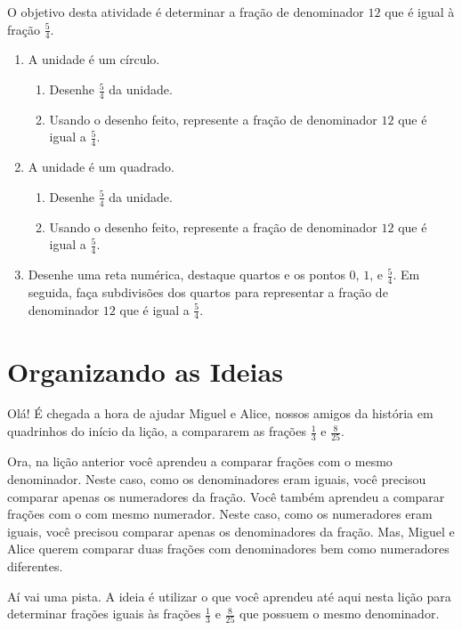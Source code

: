 \begin{atividade}{}\label{chap4-ativ8}

O objetivo desta atividade é determinar a fração de denominador $12$ que é igual à fração $\frac{5}{4}$.

\begin{enumerate}
  \item     A unidade é um círculo.
\begin{enumerate}
  \item Desenhe $\frac{5}{4}$ da unidade.
  \item Usando o desenho feito, represente a fração de denominador $12$ que é igual a $\frac{5}{4}$.
\end{enumerate}
  \item  A unidade é um quadrado.
  \begin{enumerate}
\item Desenhe $\frac{5}{4}$ da unidade.
\item Usando o desenho feito, represente a fração de denominador $12$ que é igual a $\frac{5}{4}$.
  \end{enumerate}
\item      Desenhe uma reta numérica, destaque quartos e os pontos $0$, $1$, e $\frac{5}{4}$. 
Em seguida, faça subdivisões dos quartos para representar a fração de denominador $12$ que é igual a $\frac{5}{4}$.
\end{enumerate} %
\end{atividade}

\clearpage

\section{Organizando as Ideias}

Olá! É chegada a hora de ajudar Miguel e Alice, nossos amigos da história em quadrinhos do início da lição, a compararem as frações $\frac{1}{3}$ e $\frac{8}{25}$.

Ora, na lição anterior você aprendeu a comparar frações com o mesmo denominador. Neste caso, como os denominadores eram iguais, você precisou comparar apenas os numeradores da fração. Você também aprendeu a comparar frações com o com mesmo numerador. Neste caso, como os numeradores eram iguais, você precisou comparar apenas os denominadores da fração. Mas, Miguel e Alice querem comparar duas frações com denominadores bem como numeradores diferentes.

Aí vai uma pista.  A ideia é utilizar o que você aprendeu até aqui nesta lição para determinar frações iguais às frações $\frac{1}{3}$ e $\frac{8}{25}$ que possuem o mesmo denominador.

